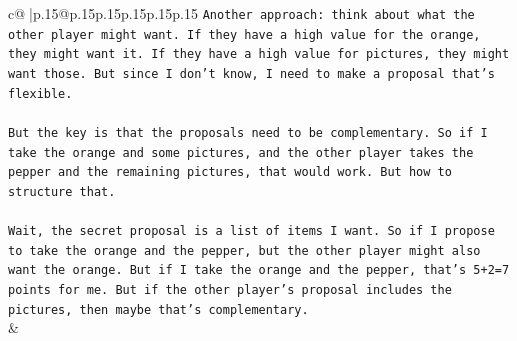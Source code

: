 \documentclass{article}
\begin{document}
{\begin{supertabular}{c@{$\;$}|p{.15\linewidth}@{}p{.15\linewidth}p{.15\linewidth}p{.15\linewidth}p{.15\linewidth}p{.15\linewidth}}
{{{\texttt{Another approach: think about what the other player might want. If they have a high value for the orange, they might want it. If they have a high value for pictures, they might want those. But since I don't know, I need to make a proposal that's flexible.} \\
\\ 
\texttt{But the key is that the proposals need to be complementary. So if I take the orange and some pictures, and the other player takes the pepper and the remaining pictures, that would work. But how to structure that.} \\
\\ 
\texttt{Wait, the secret proposal is a list of items I want. So if I propose to take the orange and the pepper, but the other player might also want the orange. But if I take the orange and the pepper, that's 5+2=7 points for me. But if the other player's proposal includes the pictures, then maybe that's complementary.} \\
            }
        }
    }
    & \\ \\


\end{supertabular}}
\end{document}
